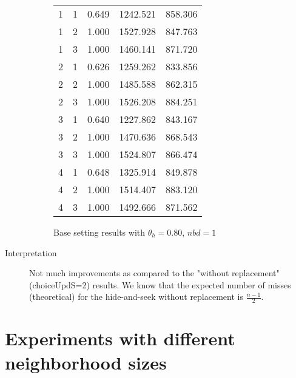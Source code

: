 \documentclass[11pt,a4paper,draft]{article}
\begin{document}
\begin{description}
\begin{figure}[!h]
\begin{tabular}{lllll}
			1 & 1 &  0.649 & 1242.521 & 858.306 \\
			1 & 2 &  1.000 & 1527.928 & 847.763 \\
			1 & 3 &  1.000 & 1460.141 & 871.720 \\
			\hline 
			2 & 1 &  0.626 & 1259.262 & 833.856 \\
			2 & 2 &  1.000 & 1485.588 & 862.315 \\
			2 & 3 &  1.000 & 1526.208 & 884.251 \\
			\hline 
			3 & 1 &  0.640 & 1227.862 & 843.167 \\
			3 & 2 &  1.000 & 1470.636 & 868.543 \\
			3 & 3 &  1.000 & 1524.807 & 866.474 \\
			\hline 
			4 & 1 &  0.648 & 1325.914 & 849.878 \\
			4 & 2 &  1.000 & 1514.407 & 883.120 \\
			4 & 3 &  1.000 & 1492.666 & 871.562 \\
			\hline 
			\hline 
		\end{tabular}
	\caption{Base setting results with $\theta_h = 0.80$, $nbd = 1$}
	\end{figure}
	\pagebreak

	\item[Interpretation] Not much improvements as compared to the "without replacement" (choiceUpdS=2) results. We know that the expected number of misses (theoretical) for the hide-and-seek without replacement is $\frac{n-1}{2}$.

\end{description}

\pagebreak

\section{Experiments with different neighborhood sizes} \label{neigh}
\end{document}
